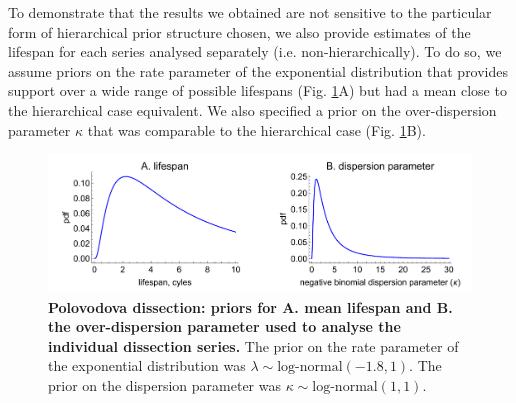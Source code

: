 \documentclass[12pt]{article}
\begin{document}
{To demonstrate that the results we obtained are not sensitive to the particular form of hierarchical prior structure chosen, we also provide estimates of the lifespan for each series analysed separately (i.e. non-hierarchically). To do so, we assume priors on the rate parameter of the exponential distribution that provides support over a wide range of possible lifespans (Fig. \ref{fig:dissection_lifespanPrior_individual}A) but had a mean close to the hierarchical case equivalent. We also specified a prior on the over-dispersion parameter $\kappa$ that was comparable to the hierarchical case (Fig. \ref{fig:dissection_lifespanPrior_individual}B).


\begin{figure}[ht]
	\centerline{\includegraphics[width=1\textwidth]{./Figure_files/dissection_lifespanPrior_individual.pdf}}
	\caption{\textbf{Polovodova dissection: priors for A. mean lifespan and B. the over-dispersion parameter used to analyse the individual dissection series.} The prior on the rate parameter of the exponential distribution was $\lambda\sim \text{log-normal}(-1.8,1)$. The prior on the dispersion parameter was $\kappa\sim \text{log-normal}(1,1)$.}\label{fig:dissection_lifespanPrior_individual}
\end{figure}

}
\end{document}
